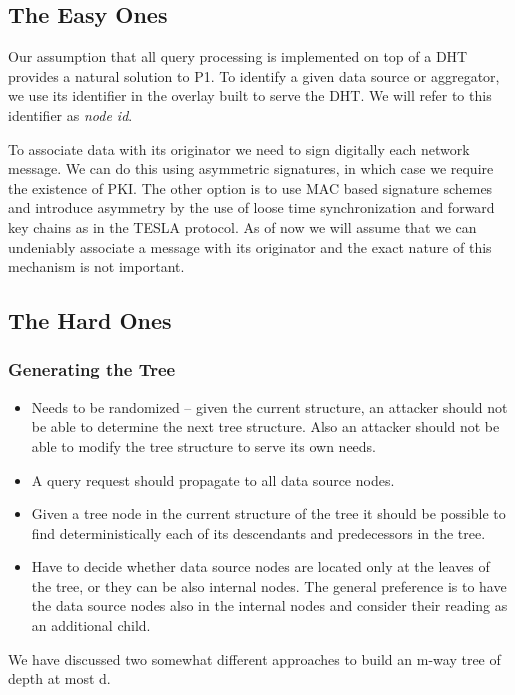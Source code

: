 \documentclass{article}
\begin{document}
\subsection{The Easy Ones}
Our assumption that all query processing is implemented on top of a
DHT provides a natural solution to P1. To identify a given data source
or aggregator, we use its identifier in the overlay built to serve the
DHT. We will refer to this identifier as \emph{node id}.

To associate data with its originator we need to sign digitally each
network message. We can do this using asymmetric signatures, in which
case we require the existence of PKI. The other option is to use MAC
based signature schemes and introduce asymmetry by the use of loose time
synchronization and forward key chains as in the TESLA protocol. As of
now we will assume that we can undeniably associate a message with its
originator and the exact nature of this mechanism is not important.

\subsection{The Hard Ones}

\subsubsection{Generating the Tree}
\begin{itemize}
\item Needs to be randomized -- given the current structure, an
  attacker should not be able to determine the next tree
  structure. Also an attacker should not be able to modify the tree
  structure to serve its own needs.
\item A query request should propagate to all data source nodes.

\item Given a tree node in the current structure of the tree it should
  be possible to find deterministically each of its descendants and
  predecessors in the tree.

\item Have to decide whether data source nodes are located only at the
  leaves of the tree, or they can be also internal nodes. The general
  preference is to have the data source nodes also in the internal
  nodes and consider their reading as an additional child.
\end{itemize}

We have discussed two somewhat different approaches to build an m-way
tree of depth at most d. 
\end{document}
